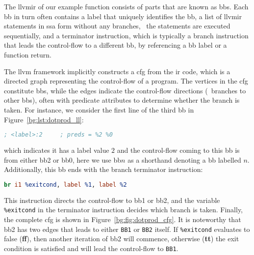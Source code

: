 The \gls{llvmir} of our example function consists of parts that are known
as \glspl{bb}.  Each \gls{bb} in turn often contains a label that uniquely
identifies the \gls{bb}, a list of \gls{llvmir} statements in \gls{ssa} form
without any branches, \ie~the statements are executed sequentially, and a
terminator instruction, which is typically a branch instruction that leads the
control-flow to a different \gls{bb}, by referencing a \gls{bb} label or a
function return.

The \gls{llvm} framework implicitly constructs a \gls{cfg} from the
\gls{ir} code, which is a directed graph representing the control-flow of
a program.  The vertices in the \gls{cfg} constitute \glspl{bb}, while
the edges indicate the control-flow directions (\ie~branches to other
\glspl{bb}), often with predicate attributes to determine whether the branch
is taken.  For instance, we consider the first line of the third \gls{bb} in
Figure~\ref{bg:lst:dotprod_ll}:
\begin{lstlisting}[language=LLVM]
    ; <label>:2     ; preds = %2 %0
\end{lstlisting}\vspace{-10pt}
which indicates it has a label value $2$ and the control-flow coming to this
\gls{bb} is from either \gls{bb}2 or \gls{bb}0, here we use \gls{bb}$n$ as a
shorthand denoting a \gls{bb} labelled $n$.  Additionally, this \gls{bb} ends
with the branch terminator instruction:
\begin{lstlisting}[language=LLVM]
    br i1 %exitcond, label %1, label %2
\end{lstlisting}\vspace{-10pt}
This instruction directs the control-flow to \gls{bb}1 or \gls{bb}2,
and the variable \verb|%exitcond| in the terminator instruction decides
which branch is taken.  Finally, the complete \gls{cfg} is shown in
Figure~\ref{bg:fig:dotprod_cfg}.  It is noteworthy that \gls{bb}2 has two edges
that leads to either \verb|BB1| or \verb|BB2| itself.  If \verb|%exitcond|
evaluates to false (\textbf{ff}), then another iteration of \gls{bb}2 will
commence, otherwise (\textbf{tt}) the exit condition is satisfied and will lead
the control-flow to \verb|BB1|.
